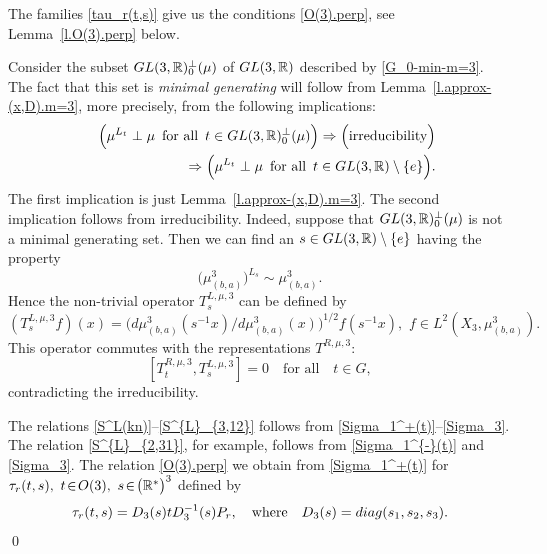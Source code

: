 \documentclass[preprint,12pt]{elsarticle}
\numberwithin{equation}{section}
\begin{document}
The families  \eqref{tau_r(t,s)} give us the  conditions 
\eqref{O(3).perp}, see Lemma~\ref{l.O(3).perp} below.
\begin{pf}
Consider the subset  ${\rm GL}(3,{\mathbb R})^\perp_{0}(\mu)$  of ${\rm GL}(3,{\mathbb R})$ described by \eqref{G_0-min-m=3}. 
The fact that this set is {\it minimal generating} will follow from Lemma~\ref{l.approx-(x,D).m=3}, more precisely, 
from the following implications:
\begin{eqnarray}
&& 
\label{1=0}
\Big(\mu^{L_t}\perp\mu\,\,\,\text{for all}\,\,\, t\in {\rm GL}(3,{\mathbb R})^\perp_0(\mu)\Big)\Rightarrow
\Big(\text{irreducibility}\Big)\\
\nonumber
&&
\Rightarrow
\Big(\mu^{L_t}\perp \mu\,\,\,\text{for all}\,\,\,t\in {\rm GL}(3,{\mathbb R})\setminus\{e\}\Big).
\end{eqnarray}
The first implication is just Lemma~\ref{l.approx-(x,D).m=3}.
The second implication follows from irreducibility. 
Indeed, suppose that ${\rm GL}(3,{\mathbb R})^\perp_0(\mu)$ is not a minimal generating set. Then   we can find  an $s\in {\rm GL}(3,{\mathbb R})\setminus\{e\}$ having the property
$$
\big(\mu_{(b,a)}^3\big)^{L_s}\sim \mu_{(b,a)}^3.
$$
Hence the non-trivial operator $T^{L,\mu,3}_s$
can be defined by
\begin{equation}
\label{T^(L,mu,3)}
(T^{L,\mu,3}_sf)(x)=\big(d\mu_{(b,a)}^3(s^{-1}x)/d\mu_{(b,a)}^3(x)\big)^{1/2}f(s^{-1}x),\,\,f\in L^2(X_3,\mu^3_{(b,a)}).
\end{equation}
This operator  commutes  with  the representations $T^{R,\mu,3}$: 
$$
[T^{R,\mu,3}_t,T^{L,\mu,3}_s]=0\quad\text{for all}\quad t\in G,
$$
contradicting the irreducibility.


The relations \eqref{S^L(kn)}--\eqref{S^{L}_{3,12}}
follows from \eqref{Sigma_1^+(t)}--\eqref{Sigma_3}.
The relation \eqref{S^{L}_{2,31}}, for example, follows from \eqref{Sigma_1^{-}(t)} and \eqref{Sigma_3}.
The relation \eqref{O(3).perp}
we obtain from \eqref{Sigma_1^+(t)} for $\tau_r(t,s),\,\,t\!\in \!{\rm O}(3),\,\,s\!\in \!\big({\mathbb R^*}\big)^3$ 
defined by 
\begin{equation}
\label{tau(t,s)}
\tau_r(t,s)=D_3(s)tD_3^{-1}(s)P_r,\quad\text{where}\quad D_3(s)={\rm diag}(s_1,s_2,s_3).
\end{equation}
\qed\end{pf}
\end{document}
